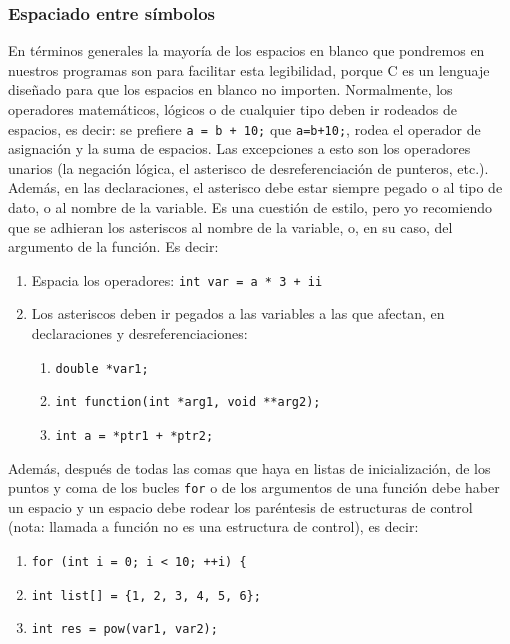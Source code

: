 \documentclass[a4paper]{article}
\begin{document}
\subsubsection{Espaciado entre símbolos}
En términos generales la mayoría de los espacios en blanco que pondremos en
nuestros programas son para facilitar esta legibilidad, porque C es un lenguaje
diseñado para que los espacios en blanco no importen. Normalmente,
los operadores matemáticos, lógicos o de cualquier tipo deben ir rodeados de
espacios, es decir: se prefiere \lstinline[style=C]!a = b + 10;!
que \lstinline[style=C]!a=b+10;!,
rodea el operador de asignación y la suma de espacios. Las excepciones a esto
son los operadores unarios (la negación lógica, el asterisco de
desreferenciación de punteros, etc.). Además, en las declaraciones, el asterisco
debe estar siempre pegado o al tipo de dato, o al nombre de la variable. Es una
cuestión de estilo, pero yo recomiendo que se adhieran los asteriscos al nombre
de la variable, o, en su caso, del argumento de la función.
Es decir:
\begin{enumerate}
\item Espacia los operadores: \lstinline[style=C]!int var = a * 3 + ii!
\item Los asteriscos deben ir pegados a las variables a las que afectan, en
declaraciones y desreferenciaciones:
\begin{enumerate}
\item \lstinline[style=C]!double *var1;!
\item \lstinline[style=C]!int function(int *arg1, void **arg2);!
\item \lstinline[style=C]!int a = *ptr1 + *ptr2;!
\end{enumerate}
\end{enumerate}

Además, después de todas las comas que haya en listas de inicialización,
de los puntos y coma de los bucles \verb!for! o de los argumentos de una función
debe haber un espacio y un espacio debe rodear los paréntesis de estructuras
de control (nota: llamada a función no es una estructura de control), es decir:

\begin{enumerate}
\item \lstinline[style=C]!for (int i = 0; i < 10; ++i)!\verb! {!
\item \lstinline[style=C]!int list[] = {1, 2, 3, 4, 5, 6};!
\item \lstinline[style=C]!int res = pow(var1, var2);!
\end{enumerate}
\end{document}

